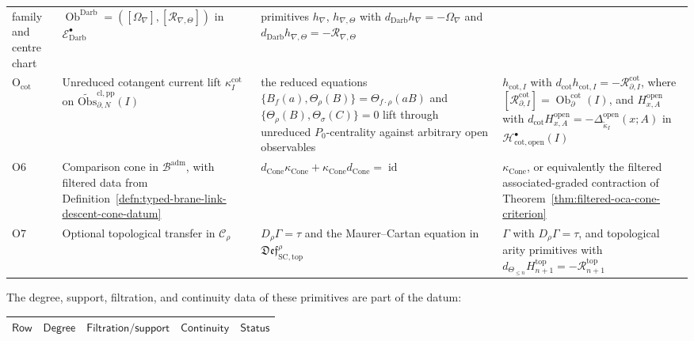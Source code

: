 \begin{thm}
\begin{center}
\begin{tabular}{@{}p{}|p{}|p{}|p{}@{}}
family and centre chart &
\(\operatorname{Ob}^{\mathrm{Darb}}
=([\Omega_{\nabla}],[\mathcal R_{\nabla,\Theta}])\) in
\(\mathcal E^\bullet_{\mathrm{Darb}}\) &
primitives \(h_{\nabla}\), \(h_{\nabla,\Theta}\) with
\(d_{\mathrm{Darb}}h_{\nabla}=-\Omega_{\nabla}\) and
\(d_{\mathrm{Darb}}h_{\nabla,\Theta}
=-\mathcal R_{\nabla,\Theta}\)\\
	\(\mathrm{O}_{\mathrm{cot}}\) &
	Unreduced cotangent current lift
	\(\kappa^{\mathrm{cot}}_I\) on
	\(\widetilde{\mathrm{Obs}}^{\mathrm{cl,pp}}_{\partial,N}(I)\) &
the reduced equations
\(\{B_f(a),\Theta_\rho(B)\}=\Theta_{f\cdot\rho}(aB)\) and
\(\{\Theta_\rho(B),\Theta_\sigma(C)\}=0\) lift through unreduced
	\(P_0\)-centrality against arbitrary open observables &
	\(h_{\mathrm{cot},I}\) with
	\(d_{\mathrm{cot}}h_{\mathrm{cot},I}
	=-\mathcal R^{\mathrm{cot}}_{\partial,I}\), where
	\([\mathcal R^{\mathrm{cot}}_{\partial,I}]
	=\operatorname{Ob}^{\mathrm{cot}}_\partial(I)\), and
	\(H^{\mathrm{open}}_{x,A}\) with
	\(d_{\mathrm{cot}}H^{\mathrm{open}}_{x,A}
	=-\Delta^{\mathrm{open}}_{\widetilde\kappa_I}(x;A)\) in
	\(\mathcal H^\bullet_{\mathrm{cot,open}}(I)\)\\
\(\mathrm{O6}\) &
Comparison cone in \(\mathcal B^{\mathrm{adm}}\), with filtered data
from Definition~\ref{defn:typed-brane-link-descent-cone-datum} &
\(d_{\operatorname{Cone}}\kappa_{\operatorname{Cone}}
+\kappa_{\operatorname{Cone}}d_{\operatorname{Cone}}
=\operatorname{id}\) &
\(\kappa_{\operatorname{Cone}}\), or equivalently the filtered
associated-graded contraction of
Theorem~\ref{thm:filtered-oca-cone-criterion}\\
\(\mathrm{O7}\) &
Optional topological transfer in \(\mathcal C_\rho\) &
\(D_\rho\Gamma=\tau\) and the Maurer--Cartan equation in
\(\mathfrak{Def}^{\rho}_{\mathrm{SC},\mathrm{top}}\) &
\(\Gamma\) with \(D_\rho\Gamma=\tau\), and topological arity primitives
with \(d_{\Theta_{\le n}}H^{\mathrm{top}}_{n+1}
=-\mathcal R^{\mathrm{top}}_{n+1}\)
\end{tabular}
\end{center}
The degree, support, filtration, and continuity data of these
primitives are part of the datum:
\begin{center}
\scriptsize
\renewcommand{\arraystretch}{1.2}
\begin{tabular}{@{}p{}|p{}|p{}|p{}|p{}@{}}
\(\mathsf{Row}\) & \(\mathsf{Degree}\) & \(\mathsf{Filtration/support}\) &
\(\mathsf{Continuity}\) & \(\mathsf{Status}\)\\\hline

\end{tabular}
\end{center}
\end{thm}
